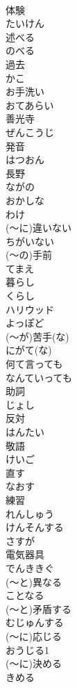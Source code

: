 \documentclass[8pt]{extreport}
\begin{document}
\begin{CJK}{UTF8}{min}
\\	体験	
\\	たいけん
\\	述べる	
\\	のべる
\\	過去	
\\	かこ
\\	お手洗い	
\\	おてあらい
\\	善光寺	
\\	ぜんこうじ
\\	発音	
\\	はつおん
\\	長野	
\\	ながの
\\	おかしな	
\\	わけ	
\\	(～に)違いない	
\\	ちがいない
\\	(～の)手前	
\\	てまえ
\\	暮らし	
\\	くらし
\\	ハリウッド	
\\	よっぽど	
\\	(～が)苦手(な)	
\\	にがて(な)
\\	何て言っても	
\\	なんていっても
\\	助詞	
\\	じょし
\\	反対	
\\	はんたい
\\	敬語	
\\	けいご
\\	直す	
\\	なおす
\\	練習	
\\	れんしゅう
\\	けんそんする	
\\	さすが	
\\	電気器具	
\\	でんききぐ
\\	(～と)異なる	
\\	ことなる
\\	(～と)矛盾する	
\\	むじゅんする
\\	(～に)応じる	
\\	おうじる1
\\	(～に)決める	
\\	きめる

\end{CJK}
\end{document}
